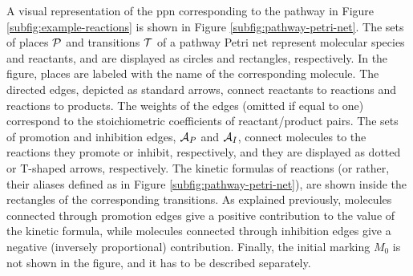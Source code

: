 \noindent A visual representation of the \gls{ppn} corresponding to the pathway in Figure \ref{subfig:example-reactions} is shown in Figure \ref{subfig:pathway-petri-net}. The sets of places $\Cal{P}$ and transitions $\Cal{T}$ of a pathway Petri net represent molecular species and reactants, and are displayed as circles and rectangles, respectively. In the figure, places are labeled with the name of the corresponding molecule. The directed edges, depicted as standard arrows, connect reactants to reactions and reactions to products. The weights of the edges (omitted if equal to one) correspond to the stoichiometric coefficients of reactant/product pairs. The sets of promotion and inhibition edges, $\Cal{A}_{P}$ and $\Cal{A}_{I}$, connect molecules to the reactions they promote or inhibit, respectively, and they are displayed as dotted or T-shaped arrows, respectively. The kinetic formulas of reactions (or rather, their aliases defined as in Figure \ref{subfig:pathway-petri-net}), are shown inside the rectangles of the corresponding transitions. As explained previously, molecules connected through promotion edges give a positive contribution to the value of the kinetic formula, while molecules connected through inhibition edges give a negative (inversely proportional) contribution. Finally, the initial marking $M_0$ is not shown in the figure, and it has to be described separately.
\begin{figure*}[h!]
    \centering
    \resizebox{.6\textwidth}{!}{}
    \caption{The Pathway Petri Net corresponding to the reactions described in Figure \ref{subfig:example-reactions}}
    \label{subfig:pathway-petri-net}
\end{figure*}

